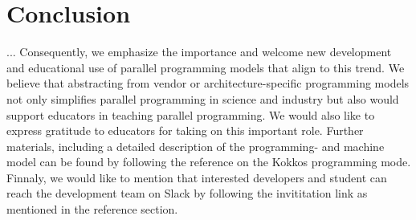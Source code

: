 \section{Conclusion}\label{chap:conclusion}
...
Consequently, we emphasize the importance and welcome new development and educational use of parallel programming models that align to this trend. We believe that abstracting from vendor or architecture-specific programming models not only simplifies parallel programming in science and industry but also would support educators in teaching parallel programming.
We would also like to express gratitude to educators for taking on this important role. Further materials, including a detailed description of the programming- and machine model can be found by following the reference on the Kokkos programming mode. Finnaly, we would like to mention that interested developers and student can reach the development team on Slack by following the invititation link as mentioned in the reference section.
